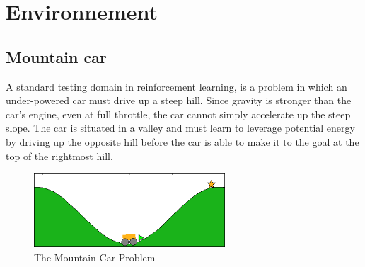\documentclass[a4paper,12pt]{article}
\begin{document}
  \begin{titlepage}
  \def\titletype{Experiments}
   \def\majortitle{Learning from expert}
   \def\docversion{1.0}
   
  \end{titlepage}

  
  \clearpage

  \tableofcontents
  

  \clearpage
  
  \renewcommand{\labelitemi}{$\bullet$}
  \renewcommand{\labelitemii}{$\circ$}
  \renewcommand{\labelitemiii}{$\diamond$}
  \renewcommand{\labelitemiv}{$\ast$}
  

  \clearpage
  \section{Environnement}
    \subsection{Mountain car}

    A standard testing domain in reinforcement learning, is a problem in which an under-powered 
    car must drive up a steep hill. Since gravity is stronger than the car's engine, even at full 
    throttle, the car cannot simply accelerate up the steep slope. The car is situated in a valley
    and must learn to leverage potential energy by driving up the opposite hill before the car is 
    able to make it to the goal at the top of the rightmost hill.
    \begin{figure}[H]
      \begin{center}
	\includegraphics[width=270px]{Mcar}
	\caption{ The Mountain Car Problem }
	\end{center}
    \end{figure}
    
\end{document}
